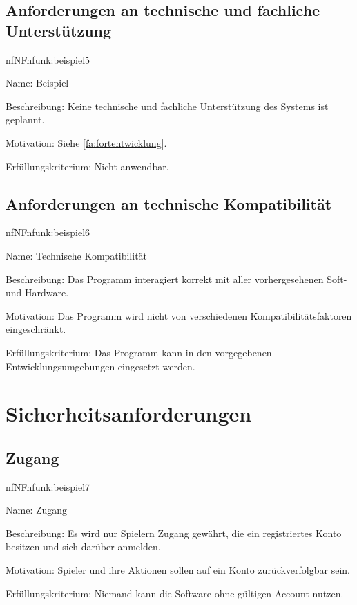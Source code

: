 \subsection{Anforderungen an technische und fachliche Unterstützung}

\begin{description}[leftmargin=5em, style=sameline]	
	\begin{lhp}{nf}{NF}{nfunk:beispiel5}
		\item [Name:] Beispiel
		\item [Beschreibung:] Keine technische und fachliche Unterstützung des Systems ist geplannt.
		\item [Motivation:] Siehe \ref{fa:fortentwicklung}.
		\item [Erfüllungskriterium:] Nicht anwendbar.
	\end{lhp}
\end{description}

\subsection{Anforderungen an technische Kompatibilität}

\begin{description}[leftmargin=5em, style=sameline]	
	\begin{lhp}{nf}{NF}{nfunk:beispiel6}
		\item [Name:] Technische Kompatibilität
		\item [Beschreibung:] Das Programm interagiert korrekt mit aller vorhergesehenen Soft- und Hardware.
		\item [Motivation:] Das Programm wird nicht von verschiedenen Kompatibilitätsfaktoren eingeschränkt.
		\item [Erfüllungskriterium:] Das Programm kann in den vorgegebenen Entwicklungsumgebungen eingesetzt werden.
	\end{lhp}
\end{description}

\section{Sicherheitsanforderungen}

\subsection{Zugang}

\begin{description}[leftmargin=5em, style=sameline]	
	\begin{lhp}{nf}{NF}{nfunk:beispiel7}
		\item [Name:] Zugang
		\item [Beschreibung:] Es wird nur Spielern Zugang gewährt, die ein registriertes Konto besitzen und sich darüber anmelden. 
		\item [Motivation:] Spieler und ihre Aktionen sollen auf ein Konto zurückverfolgbar sein.
		\item [Erfüllungskriterium:] Niemand kann die Software ohne gültigen Account nutzen.
	\end{lhp}
\end{description}

